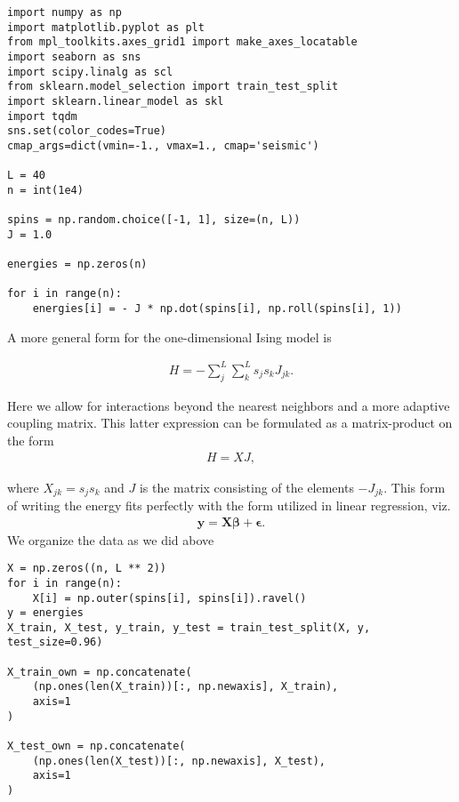 \documentclass[%
oneside,                 %
final,                   %
10pt]{article}
\begin{document}
\begin{verbatim}
import numpy as np
import matplotlib.pyplot as plt
from mpl_toolkits.axes_grid1 import make_axes_locatable
import seaborn as sns
import scipy.linalg as scl
from sklearn.model_selection import train_test_split
import sklearn.linear_model as skl
import tqdm
sns.set(color_codes=True)
cmap_args=dict(vmin=-1., vmax=1., cmap='seismic')

L = 40
n = int(1e4)

spins = np.random.choice([-1, 1], size=(n, L))
J = 1.0

energies = np.zeros(n)

for i in range(n):
    energies[i] = - J * np.dot(spins[i], np.roll(spins[i], 1))
\end{verbatim}

A more general form for the one-dimensional Ising model is

\begin{align}
    H = - \sum_j^L \sum_k^L s_j s_k J_{jk}.
\end{align}

Here we allow for interactions beyond the nearest neighbors and a more
adaptive coupling matrix. This latter expression can be formulated as
a matrix-product on the form
\begin{align}
    H = X J,
\end{align}

where $X_{jk} = s_j s_k$ and $J$ is the matrix consisting of the
elements $-J_{jk}$. This form of writing the energy fits perfectly
with the form utilized in linear regression, viz.
\begin{align}
    \bm{y} = \bm{X}\bm{\beta} + \bm{\epsilon}.
\end{align}
We organize the data as we did above
\begin{verbatim}
X = np.zeros((n, L ** 2))
for i in range(n):
    X[i] = np.outer(spins[i], spins[i]).ravel()
y = energies
X_train, X_test, y_train, y_test = train_test_split(X, y, test_size=0.96)

X_train_own = np.concatenate(
    (np.ones(len(X_train))[:, np.newaxis], X_train),
    axis=1
)

X_test_own = np.concatenate(
    (np.ones(len(X_test))[:, np.newaxis], X_test),
    axis=1
)
\end{verbatim}
\end{document}
